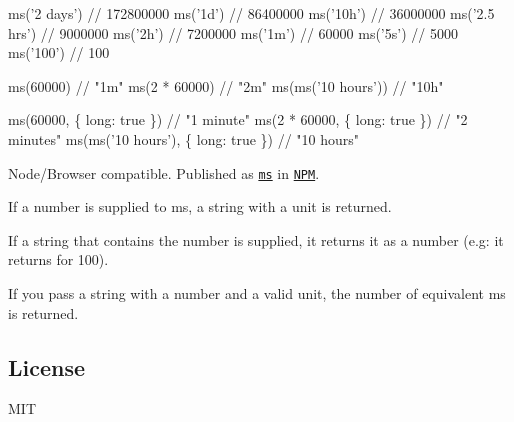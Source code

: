 
\begin{DoxyCode}
ms('2 days')  // 172800000
ms('1d')      // 86400000
ms('10h')     // 36000000
ms('2.5 hrs') // 9000000
ms('2h')      // 7200000
ms('1m')      // 60000
ms('5s')      // 5000
ms('100')     // 100
\end{DoxyCode}



\begin{DoxyCode}
ms(60000)             // "1m"
ms(2 * 60000)         // "2m"
ms(ms('10 hours'))    // "10h"
\end{DoxyCode}



\begin{DoxyCode}
ms(60000, \{ long: true \})             // "1 minute"
ms(2 * 60000, \{ long: true \})         // "2 minutes"
ms(ms('10 hours'), \{ long: true \})    // "10 hours"
\end{DoxyCode}



\begin{DoxyItemize}
\item Node/\+Browser compatible. Published as \href{https://www.npmjs.org/package/ms}{\tt {\ttfamily ms}} in \href{http://nodejs.org/download}{\tt N\+PM}.
\item If a number is supplied to {\ttfamily ms}, a string with a unit is returned.
\item If a string that contains the number is supplied, it returns it as a number (e.\+g\+: it returns {} for {\ttfamily \textquotesingle{}100\textquotesingle{}}).
\item If you pass a string with a number and a valid unit, the number of equivalent ms is returned.
\end{DoxyItemize}

\subsection*{License}

M\+IT 